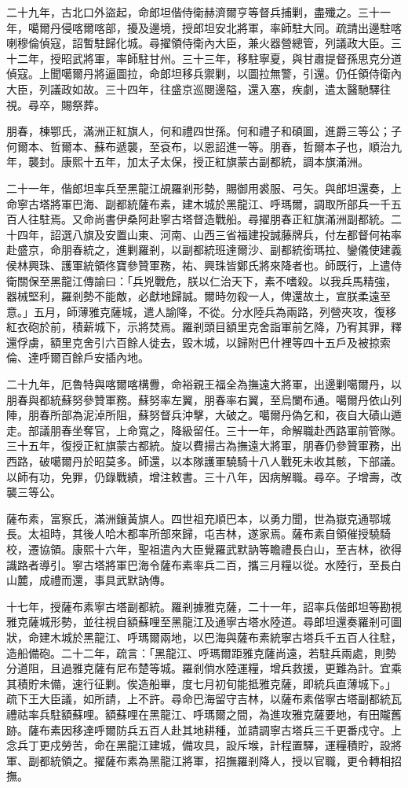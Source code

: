 \begin{pinyinscope}
二十九年，古北口外盜起，命郎坦偕侍衛赫濟爾亨等督兵捕剿，盡殲之。三十一年，噶爾丹侵喀爾喀部，擾及邊境，授郎坦安北將軍，率師駐大同。疏請出邊駐喀喇穆倫偵寇，詔暫駐歸化城。尋擢領侍衛內大臣，兼火器營總管，列議政大臣。三十二年，授昭武將軍，率師駐甘州。三十三年，移駐寧夏，與甘肅提督孫思克分道偵寇。上聞噶爾丹將逼圖拉，命郎坦移兵禦剿，以圖拉無警，引還。仍任領侍衛內大臣，列議政如故。三十四年，往盛京巡閱邊隘，還入塞，疾劇，遣太醫馳驛往視。尋卒，賜祭葬。

朋春，棟鄂氏，滿洲正紅旗人，何和禮四世孫。何和禮子和碩圖，進爵三等公；子何爾本、哲爾本、蘇布遞襲，至袞布，以恩詔進一等。朋春，哲爾本子也，順治九年，襲封。康熙十五年，加太子太保，授正紅旗蒙古副都統，調本旗滿洲。

二十一年，偕郎坦率兵至黑龍江覘羅剎形勢，賜御用裘服、弓矢。與郎坦還奏，上命寧古塔將軍巴海、副都統薩布素，建木城於黑龍江、呼瑪爾，調取所部兵一千五百人往駐焉。又命尚書伊桑阿赴寧古塔督造戰船。尋擢朋春正紅旗滿洲副都統。二十四年，詔選八旗及安置山東、河南、山西三省福建投誠藤牌兵，付左都督何祐率赴盛京，命朋春統之，進剿羅剎，以副都統班達爾沙、副都統銜瑪拉、鑾儀使建義侯林興珠、護軍統領佟寶參贊軍務，祐、興珠皆鄭氏將來降者也。師既行，上遣侍衛關保至黑龍江傳諭曰：「兵兇戰危，朕以仁治天下，素不嗜殺。以我兵馬精強，器械堅利，羅剎勢不能敵，必獻地歸誠。爾時勿殺一人，俾還故土，宣朕柔遠至意。」五月，師薄雅克薩城，遣人諭降，不從。分水陸兵為兩路，列營夾攻，復移紅衣砲於前，積薪城下，示將焚焉。羅剎頭目額里克舍詣軍前乞降，乃宥其罪，釋還俘虜，額里克舍引六百餘人徙去，毀木城，以歸附巴什裡等四十五戶及被掠索倫、達呼爾百餘戶安插內地。

二十九年，厄魯特與喀爾喀構釁，命裕親王福全為撫遠大將軍，出邊剿噶爾丹，以朋春與都統蘇努參贊軍務。蘇努率左翼，朋春率右翼，至烏闌布通。噶爾丹依山列陣，朋春所部為泥淖所阻，蘇努督兵沖擊，大破之。噶爾丹偽乞和，夜自大磧山遁走。部議朋春坐奪官，上命寬之，降級留任。三十一年，命解職赴西路軍前管隊。三十五年，復授正紅旗蒙古都統。旋以費揚古為撫遠大將軍，朋春仍參贊軍務，出西路，破噶爾丹於昭莫多。師還，以本隊護軍驍騎十八人戰死未收其骸，下部議。以師有功，免罪，仍錄戰績，增注敕書。三十八年，因病解職。尋卒。子增壽，改襲三等公。

薩布素，富察氏，滿洲鑲黃旗人。四世祖充順巴本，以勇力聞，世為嶽克通鄂城長。太祖時，其後人哈木都率所部來歸，屯吉林，遂家焉。薩布素自領催授驍騎校，遷協領。康熙十六年，聖祖遣內大臣覺羅武默訥等瞻禮長白山，至吉林，欲得識路者導引。寧古塔將軍巴海令薩布素率兵二百，攜三月糧以從。水陸行，至長白山麓，成禮而還，事具武默訥傳。

十七年，授薩布素寧古塔副都統。羅剎據雅克薩，二十一年，詔率兵偕郎坦等勘視雅克薩城形勢，並往視自額蘇哩至黑龍江及通寧古塔水陸道。尋郎坦還奏羅剎可圖狀，命建木城於黑龍江、呼瑪爾兩地，以巴海與薩布素統寧古塔兵千五百人往駐，造船備砲。二十二年，疏言：「黑龍江、呼瑪爾距雅克薩尚遠，若駐兵兩處，則勢分道阻，且過雅克薩有尼布楚等城。羅剎倘水陸運糧，增兵救援，更難為計。宜乘其積貯未備，速行征剿。俟造船畢，度七月初旬能抵雅克薩，即統兵直薄城下。」疏下王大臣議，如所請，上不許。尋命巴海留守吉林，以薩布素偕寧古塔副都統瓦禮祜率兵駐額蘇哩。額蘇哩在黑龍江、呼瑪爾之間，為進攻雅克薩要地，有田隴舊跡。薩布素因移達呼爾防兵五百人赴其地耕種，並請調寧古塔兵三千更番戍守。上念兵丁更戍勞苦，命在黑龍江建城，備攻具，設斥堠，計程置驛，運糧積貯，設將軍、副都統領之。擢薩布素為黑龍江將軍，招撫羅剎降人，授以官職，更令轉相招撫。


\end{pinyinscope}
